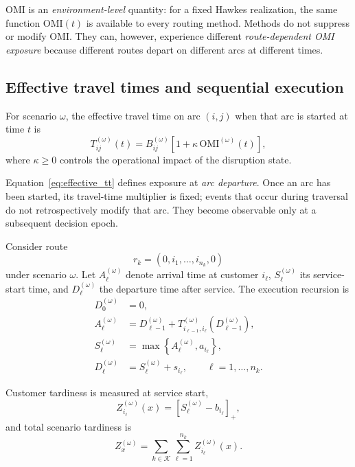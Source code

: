 \documentclass[preprint,12pt]{elsarticle}
\newcommand{\1}{\mathbf{1}}
\begin{document}
OMI is an \emph{environment-level} quantity: for a fixed Hawkes realization,
the same function $\mathrm{OMI}(t)$ is available to every routing method.
Methods do not suppress or modify OMI. They can, however, experience different
\emph{route-dependent OMI exposure} because different routes depart on different
arcs at different times.

\subsection{Effective travel times and sequential execution}
\label{subsec:execution}

For scenario $\omega$, the effective travel time on arc $(i,j)$ when that arc
is started at time $t$ is
\begin{equation}
	T_{ij}^{(\omega)}(t)
	=
	B_{ij}^{(\omega)}
	\left[
	1+\kappa\,\mathrm{OMI}^{(\omega)}(t)
	\right],
	\label{eq:effective_tt}
\end{equation}
where $\kappa\ge0$ controls the operational impact of the disruption state.

Equation~\eqref{eq:effective_tt} defines exposure at \emph{arc departure}.
Once an arc has been started, its travel-time multiplier is fixed; events that
occur during traversal do not retrospectively modify that arc. They become
observable only at a subsequent decision epoch.

Consider route
\[
r_k=(0,i_1,\ldots,i_{n_k},0)
\]
under scenario $\omega$.
Let $A_\ell^{(\omega)}$ denote arrival time at customer $i_\ell$,
$S_\ell^{(\omega)}$ its service-start time, and
$D_\ell^{(\omega)}$ the departure time after service.
The execution recursion is
\begin{align}
	D_0^{(\omega)} &= 0,
	\\
	A_\ell^{(\omega)}
	&=
	D_{\ell-1}^{(\omega)}
	+
	T_{i_{\ell-1},i_\ell}^{(\omega)}
	\!\left(D_{\ell-1}^{(\omega)}\right),
	\\
	S_\ell^{(\omega)}
	&=
	\max\left\{
	A_\ell^{(\omega)},a_{i_\ell}
	\right\},
	\\
	D_\ell^{(\omega)}
	&=
	S_\ell^{(\omega)}
	+
	s_{i_\ell},
	\qquad
	\ell=1,\ldots,n_k.
	\label{eq:schedule_recursion}
\end{align}

Customer tardiness is measured at service start,
\begin{equation}
	Z_{i_\ell}^{(\omega)}(x)
	=
	\left[
	S_\ell^{(\omega)}-b_{i_\ell}
	\right]_+,
	\label{eq:customer_tardiness}
\end{equation}
and total scenario tardiness is
\begin{equation}
	Z_x^{(\omega)}
	=
	\sum_{k\in\mathcal{K}}
	\sum_{\ell=1}^{n_k}
	Z_{i_\ell}^{(\omega)}(x).
	\label{eq:total_tardiness}
\end{equation}
\end{document}
